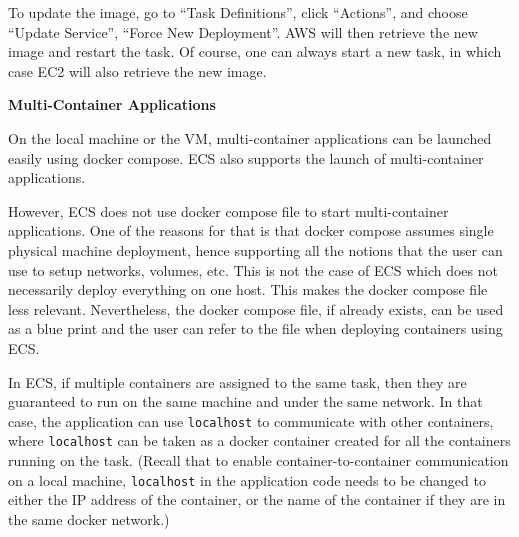 To update the image, go to ``Task Definitions'', click ``Actions'', and choose ``Update Service'', ``Force New Deployment''. AWS will then retrieve the new image and restart the task. Of course, one can always start a new task, in which case EC2 will also retrieve the new image. 

\vspace{0.1in}
\noindent \textbf{Multi-Container Applications}
\vspace{0.1in}


On the local machine or the VM, multi-container applications can be launched easily using docker compose. ECS also supports the launch of multi-container applications. 

However, ECS does not use docker compose file to start multi-container applications. One of the reasons for that is that docker compose assumes single physical machine deployment, hence supporting all the notions that the user can use to setup networks, volumes, etc. This is not the case of ECS which does not necessarily deploy everything on one host. This makes the docker compose file less relevant. Nevertheless, the docker compose file, if already exists, can be used as a blue print and the user can refer to the file when deploying containers using ECS.

In ECS, if multiple containers are assigned to the same task, then they are guaranteed to run on the same machine and under the same network. In that case, the application can use \verb|localhost| to communicate with other containers, where \verb|localhost| can be taken as a docker container created for all the containers running on the task. (Recall that to enable container-to-container communication on a local machine, \verb|localhost| in the application code needs to be changed to either the IP address of the container, or the name of the container if they are in the same docker network.)























